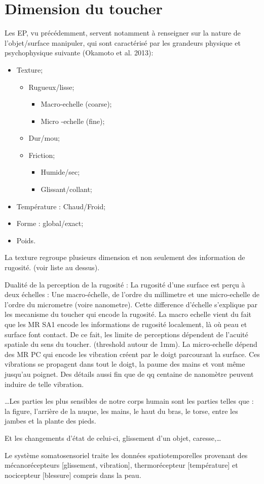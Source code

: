 \section{Dimension du toucher}
Les EP, vu précédemment, servent notamment à renseigner sur la nature de l’objet/surface manipuler, qui sont caractérisé par les grandeurs physique et psychophysique suivante (Okamoto et al. 2013):
\begin{itemize}
	\item Texture;
	\begin{itemize}
		\item Rugueux/lisse;
		\begin{itemize}
			\item Macro-echelle (coarse);
			\item Micro -echelle (fine);
		\end{itemize}
		\item Dur/mou;
		\item Friction;
		\begin{itemize}
			\item Humide/sec;
			\item Glissant/collant;
		\end{itemize}
	\end{itemize}
	\item Température : Chaud/Froid;
	\item Forme : global/exact;
	\item Poids.
\end{itemize}
La texture regroupe plusieurs dimension et non seulement des information de rugosité. (voir liste au dessus).\par
Dualité de la perception de la rugosité : La rugosité d’une surface est perçu à deux échelles : Une macro-échelle, de l’ordre du millimetre et une micro-echelle de l’ordre du micrometre (voire nanometre). Cette difference d’échelle s’explique par les mecanisme du toucher qui encode la rugosité. La macro echelle vient du fait que les MR SA1 encode les informations de rugosité localement, là où peau et surface font contact. De ce fait, les limite de perceptions dépendent de l’acuité spatiale du sens du toucher. (threshold autour de 1mm). La micro-echelle dépend des MR PC qui encode les vibration créent par le doigt parcourant la surface. Ces vibrations se propagent dans tout le doigt, la paume des mains et vont même jusqu’au poignet. Des détails aussi fin que de qq centaine de nanomètre peuvent induire de telle vibration.\par
…Les parties les plus sensibles de notre corps humain sont les parties telles que : la figure, l’arrière de la nuque, les mains, le haut du bras, le torse, entre les jambes et la plante des pieds.\par
Et les changements d’état de celui-ci, glissement d’un objet, caresse,…\par
Le système somatosensoriel traite les données spatiotemporelles provenant des mécanorécepteurs [glissement, vibration], thermorécepteur [température] et nocicepteur [blessure] compris dans la peau.\par



